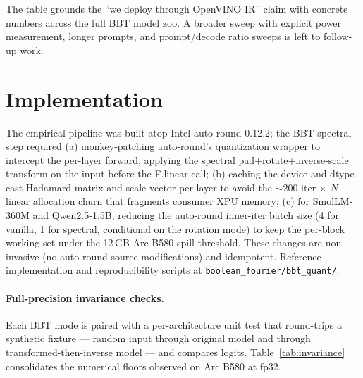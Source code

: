 \documentclass[11pt]{article}
\begin{document}
The table grounds the ``we deploy through OpenVINO IR'' claim with concrete numbers across the full BBT model zoo. A broader sweep with explicit power measurement, longer prompts, and prompt/decode ratio sweeps is left to follow-up work.

\section{Implementation}

The empirical pipeline was built atop Intel auto-round 0.12.2; the BBT-spectral step required (a) monkey-patching auto-round's quantization wrapper to intercept the per-layer forward, applying the spectral pad+rotate+inverse-scale transform on the input before the F.linear call; (b) caching the device-and-dtype-cast Hadamard matrix and scale vector per layer to avoid the $\sim$200-iter $\times$ $N$-linear allocation churn that fragments consumer XPU memory; (c) for SmolLM-360M and Qwen2.5-1.5B, reducing the auto-round inner-iter batch size (4 for vanilla, 1 for spectral, conditional on the rotation mode) to keep the per-block working set under the 12\,GB Arc B580 spill threshold. These changes are non-invasive (no auto-round source modifications) and idempotent. Reference implementation and reproducibility scripts at \texttt{boolean\_fourier/bbt\_quant/}.

\paragraph{Full-precision invariance checks.}
Each BBT mode is paired with a per-architecture unit test that round-trips a synthetic fixture --- random input through original model and through transformed-then-inverse model --- and compares logits. Table~\ref{tab:invariance} consolidates the numerical floors observed on Arc B580 at fp32.
\end{document}
